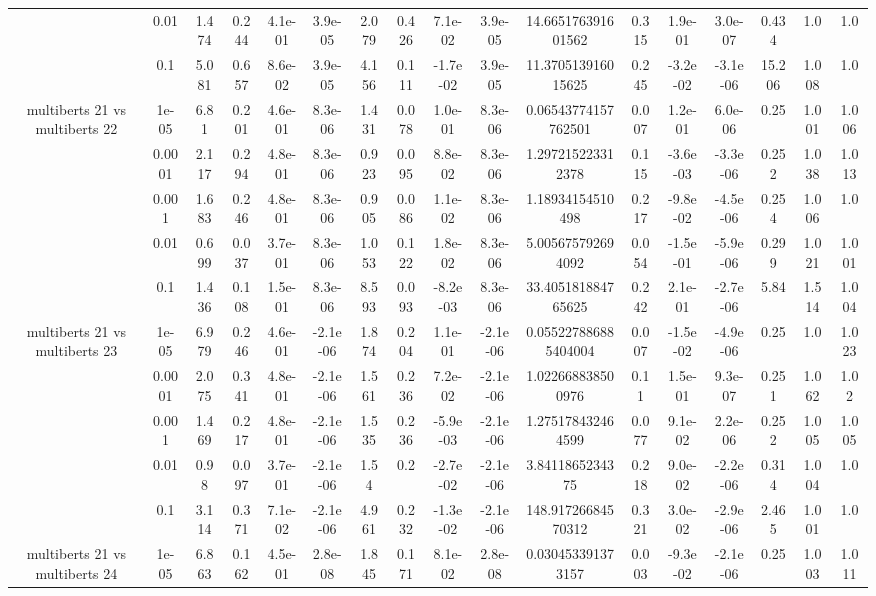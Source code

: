 \begin{tabular}{|c|c|c|c|c|c|c|c|c|c|c|c|c|c|c|c|c|}
 & 0.01 & 1.474 & 0.244 & 4.1e-01 & 3.9e-05 & 2.079 & 0.426 & 7.1e-02 & 3.9e-05 & 14.665176391601562 & 0.315 & 1.9e-01 & 3.0e-07 & 0.434 & 1.0 & 1.0 \\
 & 0.1 & 5.081 & 0.657 & 8.6e-02 & 3.9e-05 & 4.156 & 0.111 & -1.7e-02 & 3.9e-05 & 11.370513916015625 & 0.245 & -3.2e-02 & -3.1e-06 & 15.206 & 1.008 & 1.0 \\
\hline
\multirow{5}{*}{multiberts 21 vs multiberts 22} & 1e-05 & 6.81 & 0.201 & 4.6e-01 & 8.3e-06 & 1.431 & 0.078 & 1.0e-01 & 8.3e-06 & 0.06543774157762501 & 0.007 & 1.2e-01 & 6.0e-06 & 0.25 & 1.001 & 1.006 \\
 & 0.0001 & 2.117 & 0.294 & 4.8e-01 & 8.3e-06 & 0.923 & 0.095 & 8.8e-02 & 8.3e-06 & 1.297215223312378 & 0.115 & -3.6e-03 & -3.3e-06 & 0.252 & 1.038 & 1.013 \\
 & 0.001 & 1.683 & 0.246 & 4.8e-01 & 8.3e-06 & 0.905 & 0.086 & 1.1e-02 & 8.3e-06 & 1.18934154510498 & 0.217 & -9.8e-02 & -4.5e-06 & 0.254 & 1.006 & 1.0 \\
 & 0.01 & 0.699 & 0.037 & 3.7e-01 & 8.3e-06 & 1.053 & 0.122 & 1.8e-02 & 8.3e-06 & 5.005675792694092 & 0.054 & -1.5e-01 & -5.9e-06 & 0.299 & 1.021 & 1.001 \\
 & 0.1 & 1.436 & 0.108 & 1.5e-01 & 8.3e-06 & 8.593 & 0.093 & -8.2e-03 & 8.3e-06 & 33.405181884765625 & 0.242 & 2.1e-01 & -2.7e-06 & 5.84 & 1.514 & 1.004 \\
\hline
\multirow{5}{*}{multiberts 21 vs multiberts 23} & 1e-05 & 6.979 & 0.246 & 4.6e-01 & -2.1e-06 & 1.874 & 0.204 & 1.1e-01 & -2.1e-06 & 0.055227886885404004 & 0.007 & -1.5e-02 & -4.9e-06 & 0.25 & 1.0 & 1.023 \\
 & 0.0001 & 2.075 & 0.341 & 4.8e-01 & -2.1e-06 & 1.561 & 0.236 & 7.2e-02 & -2.1e-06 & 1.022668838500976 & 0.11 & 1.5e-01 & 9.3e-07 & 0.251 & 1.062 & 1.02 \\
 & 0.001 & 1.469 & 0.217 & 4.8e-01 & -2.1e-06 & 1.535 & 0.236 & -5.9e-03 & -2.1e-06 & 1.275178432464599 & 0.077 & 9.1e-02 & 2.2e-06 & 0.252 & 1.005 & 1.005 \\
 & 0.01 & 0.98 & 0.097 & 3.7e-01 & -2.1e-06 & 1.54 & 0.2 & -2.7e-02 & -2.1e-06 & 3.8411865234375 & 0.218 & 9.0e-02 & -2.2e-06 & 0.314 & 1.004 & 1.0 \\
 & 0.1 & 3.114 & 0.371 & 7.1e-02 & -2.1e-06 & 4.961 & 0.232 & -1.3e-02 & -2.1e-06 & 148.91726684570312 & 0.321 & 3.0e-02 & -2.9e-06 & 2.465 & 1.001 & 1.0 \\
\hline
\multirow{5}{*}{multiberts 21 vs multiberts 24} & 1e-05 & 6.863 & 0.162 & 4.5e-01 & 2.8e-08 & 1.845 & 0.171 & 8.1e-02 & 2.8e-08 & 0.030453391373157 & 0.003 & -9.3e-02 & -2.1e-06 & 0.25 & 1.003 & 1.011 \\

\end{tabular}
